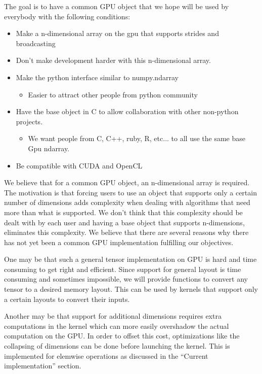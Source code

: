 \documentclass{article} %
\begin{document}
The goal is to have a common GPU object that we hope will be used by everybody with the following conditions:

\begin{itemize}
\item Make a n-dimensional array on the gpu that supports strides and broadcasting
\item Don't make development harder with this n-dimensional array. 
\item Make the python interface similar to numpy.ndarray
  \begin{itemize}
  \item Easier to attract other people from python community
  \end{itemize}
\item Have the base object in C to allow collaboration with other non-python projects.
  \begin{itemize}
  \item We want people from C, C++, ruby, R, etc... to all use the same base Gpu ndarray.
  \end{itemize}
\item Be compatible with CUDA and OpenCL
\end{itemize}

We believe that for a common GPU object, an n-dimensional array is required.
The motivation is that forcing users to use an object that supports only a certain number of dimensions adds complexity when dealing with algorithms that need more than what is supported.
We don't think that this complexity should be dealt with by each user and having a base object that supports n-dimensions, eliminates this complexity.
We believe that there are several reasons why there has not yet been a common GPU implementation fulfilling our objectives.

One may be that such a general tensor implementation on GPU is hard and time consuming to get right and efficient.
Since support for general layout is time consuming and sometimes impossible, we will provide functions to convert any tensor to a desired memory layout.  This can be used by kernels that support only a certain layouts to convert their inputs.

Another may be that support for additional dimensions requires extra computations in the kernel which can more easily overshadow the actual computation on the GPU.
In order to offset this cost, optimizations like the collapsing of dimensions can be done before launching the kernel.  
This is implemented for elemwise operations as discussed in the ``Current implementation'' section.
\end{document}
